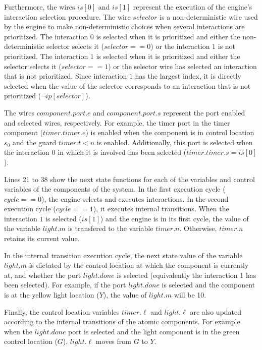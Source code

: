 Furthermore, the wires $is[0]$ and $is[1]$ represent the execution of the 
engine's interaction selection procedure. The wire $selector$ is
a non-deterministic wire used by the engine to make non-deterministic
choices when several interactions are prioritized. 
The interaction $0$ is selected
when it is prioritized and either the non-deterministic selector 
selects it ($selector == 0$)
or the interaction $1$ is not prioritized. 
The interaction $1$ is selected when it is prioritized and either 
the selector selects it ($selector == 1$) or the selector wire
has selected an interaction that is not prioritized. Since interaction
$1$ has the largest index, it is
directly selected when the value of the selector corresponds
to an interaction that is not prioritized ($\lnot ip[selector]$).

The wires $component.port.e$ and $component.port.s$ represent the 
port enabled and selected wires, respectively. 
For example, the timer port 
in the timer component ($timer.timer.e$) is enabled when the 
component is in control location $s_0$ and the guard $timer.t < n$ is
enabled. Additionally, this port is selected when the interaction $0$ 
in which it is involved has been selected ($timer.timer.s = is[0]$).

Lines 21 to 38 show the next state functions for each of the variables
and control variables of the components of the system. 
In the first execution cycle ($cycle == 0$), 
the engine selects and executes interactions.
In the second execution cycle ($cycle == 1$), 
it executes internal transitions. 
When the interaction $1$ is selected ($is[1]$) and the engine is 
in its first cycle, the value of the variable $light.m$ is transfered
to the variable $timer.n$. Otherwise, $timer.n$ retains its current
value.

In the internal transition execution cycle, the next state value of
the variable $light.m$ is dictated by the control location at which the component is currently at, and whether the port $light.done$
is selected (equivalently the interaction $1$ has been selected).
For example, if the port $light.done$ is selected and the component 
is at the yellow light location ($Y$), the value of
$light.m$ will be 10. 

Finally, the control location variables $timer.\ell$ and 
$light.\ell$ are also updated according to the internal transitions of the 
atomic components. For example when the $light.done$ port is selected
and the light component is in the green control location ($G$), 
 $light.\ell$ moves from $G$ to $Y$. 

